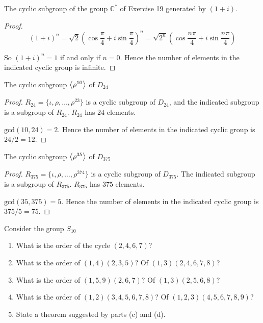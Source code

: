 \newpage
\begin{exercise}
    The cyclic subgroup of the group $\mathbb{C}^{*}$ of Exercise 19 generated by $(1 + i)$.
\end{exercise}

\begin{proof}
    \[
        {(1 + i)}^{n} = {\sqrt{2}(\cos\frac{\pi}{4} + i\sin\frac{\pi}{4})}^{n} = \sqrt{2^{n}}(\cos\frac{n\pi}{4} + i\sin\frac{n\pi}{4})
    \]

    So ${(1 + i)}^{n} = 1$ if and only if $n = 0$. Hence the number of elements in the indicated cyclic group is infinite.
\end{proof}

\newpage
\begin{exercise}
    The cyclic subgroup $\left\langle{\rho^{10}}\right\rangle$ of $D_{24}$
\end{exercise}

\begin{proof}
    $R_{24} = \{ \iota, \rho, \ldots, \rho^{23} \}$ is a cyclic subgroup of $D_{24}$, and the indicated subgroup is a subgroup of $R_{24}$. $R_{24}$ has $24$ elements.

    $\text{gcd}(10, 24) = 2$. Hence the number of elements in the indicated cyclic group is $24/2 = 12$.
\end{proof}

\newpage
\begin{exercise}
    The cyclic subgroup $\left\langle{\rho^{35}}\right\rangle$ of $D_{375}$
\end{exercise}

\begin{proof}
    $R_{375} = \{ \iota, \rho, \ldots, \rho^{374} \}$ is a cyclic subgroup of $D_{375}$. The indicated subgroup is a subgroup of $R_{375}$. $R_{375}$ has $375$ elements.

    $\text{gcd}(35, 375) = 5$. Hence the number of elements in the indicated cyclic group is $375/5 = 75$.
\end{proof}

\newpage
\begin{exercise}
    Consider the group $S_{10}$
    \begin{enumerate}[label={\textbf{\alph*.}}]
        \item What is the order of the cycle $(2, 4, 6, 7)$?
        \item What is the order of $(1, 4)(2, 3, 5)$? Of $(1, 3)(2, 4, 6, 7, 8)$?
        \item What is the order of $(1, 5, 9)(2, 6, 7)$? Of $(1, 3)(2, 5, 6, 8)$?
        \item What is the order of $(1, 2)(3, 4, 5, 6, 7, 8)$? Of $(1, 2, 3)(4, 5, 6, 7, 8, 9)$?
        \item State a theorem suggested by parts (c) and (d).
    \end{enumerate}
\end{exercise}

